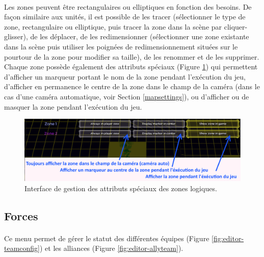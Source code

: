 \documentclass[a4paper]{article}
\begin{document}
\paragraph{ }
Les zones peuvent être rectangulaires ou elliptiques en fonction des besoins. De façon similaire aux unités, il est possible de les tracer (sélectionner le type de zone, rectangulaire ou elliptique, puis tracer la zone dans la scène par cliquer-glisser), de les déplacer, de les redimensionner (sélectionner une zone existante dans la scène puis utiliser les poignées de redimensionnement situées sur le pourtour de la zone pour modifier sa taille), de les renommer et de les supprimer. Chaque zone possède également des attributs spéciaux (Figure \ref{fig:editor-zones-special}) qui permettent d'afficher un marqueur portant le nom de la zone pendant l'exécution du jeu, d'afficher en permanence le centre de la zone dans le champ de la caméra (dans le cas d'une caméra automatique, voir Section \ref{mapsettings}), ou d'afficher ou de masquer la zone pendant l'exécution du jeu.
\begin{figure}[H]
\centering
\includegraphics[width=\linewidth]{editor-zones-special.png}
\caption{Interface de gestion des attributs spéciaux des zones logiques.}
\label{fig:editor-zones-special}
\end{figure}
\subsection{Forces}
\paragraph{ }
Ce menu permet de gérer le statut des différentes équipes (Figure \ref{fig:editor-teamconfig}) et les alliances (Figure \ref{fig:editor-allyteam}).
\end{document}
